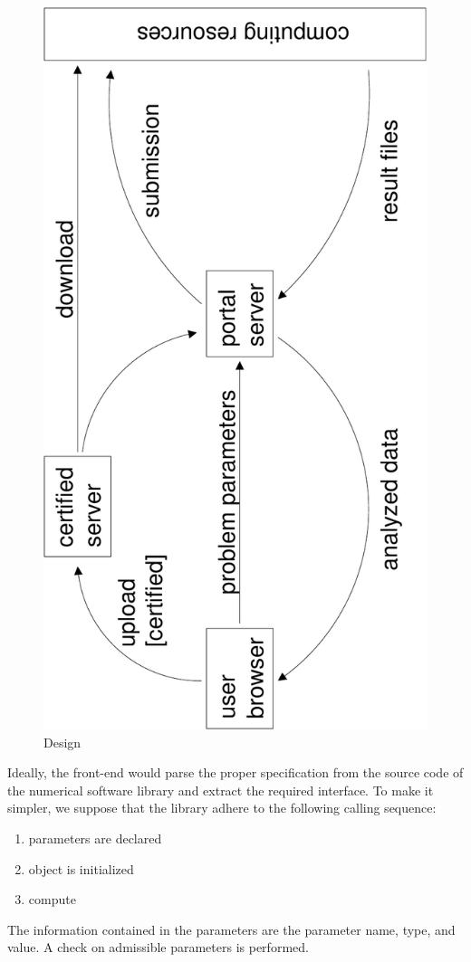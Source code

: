 \documentclass[11pt,relax]{SANDreport}
\begin{document}
\begin{figure}
\begin{center}
\includegraphics[width=14cm]{portal_design}
\caption{Design}
\end{center}
\label{fig:design}
\end{figure}

Ideally, the front-end would parse the proper specification from the source
code of the numerical software library and extract the required interface. To
make it simpler, we suppose that the library adhere to the following calling
sequence:
\begin{enumerate}
\setlength{\itemsep}{0pt}
\item parameters are declared
\item object is initialized
\item compute
\end{enumerate}
The information contained in the parameters are the parameter name, type, and
value. A check on admissible parameters is performed.
\end{document}
